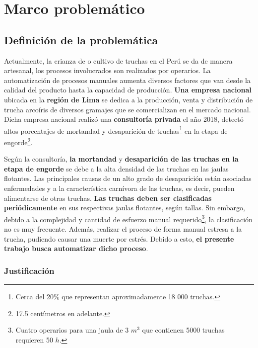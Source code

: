 
\pagestyle{myportland}
\doublespacing
\chapter[----- Marco problemático]{Marco problemático}
\thispagestyle{myportland}

\section{Definición de la problemática}

Actualmente, la crianza de o cultivo de truchas en el Perú se da de manera artesanal, los procesos involucrados son realizados por operarios. La automatización de procesos manuales aumenta diversos factores que van desde la calidad del producto hasta la capacidad de producción. \textbf{Una empresa nacional} ubicada en la \textbf{región de Lima} se dedica a la producción, venta y distribución de trucha arcoíris de diversos gramajes que se comercializan en el mercado nacional. Dicha empresa nacional realizó una \textbf{consultoría privada} el año 2018, detectó altos porcentajes de mortandad y desaparición de truchas\footnote{Cerca del 20\% que representan aproximadamente 18 000 truchas.} en la etapa de engorde\footnote{17.5 centímetros en adelante.}.

Según la consultoría, \textbf{la mortandad} y \textbf{desaparición de las truchas en la etapa de engorde} se debe a la alta densidad de las truchas en las jaulas flotantes. Las principales causas de un alto grado de desaparición están asociadas enfermedades y a la característica carnívora de las truchas, es decir, pueden alimentarse de otras truchas. \textbf{Las truchas deben ser clasificadas periódicamente} en sus respectivas jaulas flotantes, según tallas. Sin embargo, debido a la complejidad y cantidad de esfuerzo manual requerido\footnote{Cuatro operarios para una jaula de 3 $ m^3 $ que contienen 5000 truchas requieren 50 $ h $.}, la clasificación no es muy frecuente. Además, realizar el proceso de forma manual estresa a la trucha, pudiendo causar una muerte por estrés. Debido a esto, \textbf{el presente trabajo busca automatizar dicho proceso}.

\subsection{Justificación}

